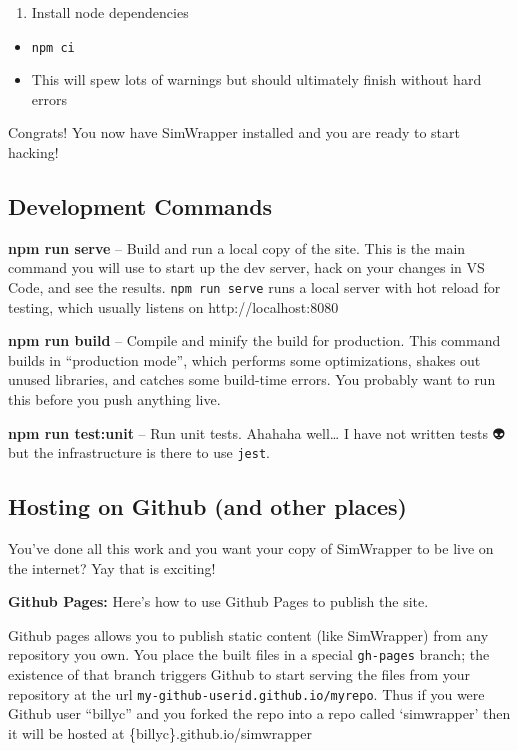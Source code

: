 \begin{enumerate}
\def\labelenumi{\arabic{enumi}.}
\setcounter{enumi}{1}
\tightlist
\item
  Install node dependencies
\end{enumerate}

\begin{itemize}
\tightlist
\item
  \texttt{npm\ ci}
\item
  This will spew lots of warnings but should ultimately finish without
  hard errors
\end{itemize}

Congrats! You now have SimWrapper installed and you are ready to start
hacking! 🎉✨

\hypertarget{development-commands}{%
\subsection{Development Commands}\label{development-commands}}

\textbf{npm run serve} -- Build and run a local copy of the site. This
is the main command you will use to start up the dev server, hack on
your changes in VS Code, and see the results. \texttt{npm\ run\ serve}
runs a local server with hot reload for testing, which usually listens
on http://localhost:8080

\textbf{npm run build} -- Compile and minify the build for production.
This command builds in ``production mode'', which performs some
optimizations, shakes out unused libraries, and catches some build-time
errors. You probably want to run this before you push anything live.

\textbf{npm run test:unit} -- Run unit tests. Ahahaha well\ldots{} I
have not written tests 👽 but the infrastructure is there to use
\texttt{jest}.

\hypertarget{hosting-on-github-and-other-places}{%
\subsection{Hosting on Github (and other
places)}\label{hosting-on-github-and-other-places}}

You've done all this work and you want your copy of SimWrapper to be
live on the internet? Yay that is exciting!

\textbf{Github Pages:} Here's how to use Github Pages to publish the
site.

Github pages allows you to publish static content (like SimWrapper) from
any repository you own. You place the built files in a special
\texttt{gh-pages} branch; the existence of that branch triggers Github
to start serving the files from your repository at the url
\texttt{my-github-userid.github.io/myrepo}. Thus if you were Github user
``billyc'' and you forked the repo into a repo called `simwrapper' then
it will be hosted at \{billyc\}.github.io/simwrapper

